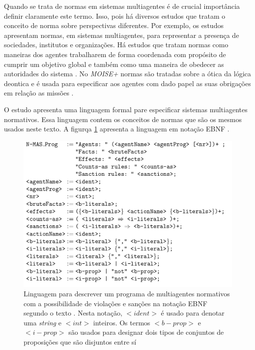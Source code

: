 Quando se trata de normas em sistemas multiagentes é de crucial importância definir claramente este termo. Isso, pois há diversos estudos que tratam o conceito de norma sobre perspectivas
diferentes. Por exemplo, os estudos \cite{formalizeagent} \cite{formalizeagent2} apresentam normas, em sistemas multiagentes, para representar a presença de sociedades, institutos e organizações.
Há estudos que tratam normas como maneiras dos agentes trabalharem de forma coordenada com propósito de cumprir um objetivo global e também como uma maneira de obedecer as autoridades do 
sistema \cite{modelingnormsforautnomousagent} \cite{amodelmultiagentsystemdynamicrelationship}. No \textit{MOISE+} normas são tratadas sobre a ótica da lógica deontica e é usada
para especificar aos agentes com dado papel as suas obrigações em relação as missões \cite{moiseframework} \cite{moiseframeworktwo}.

O estudo \cite{dastaniframework} apresenta uma linguagem formal pare especificar sistemas multiagentes normativos. Essa linguagem contem os conceitos de normas que são os mesmos usados 
neste texto. A figurqa \ref{descreveprograma} apresenta a linguagem em notação EBNF \cite{dastaniframework}.

\begin{figure}[H]
  \centering
  \includegraphics[width=0.8\linewidth]{figure/masprogram.png} 
  \caption{Linguagem para descrever um programa de multiagentes normativos com a possibilidade de violações e sanções na notação EBNF segundo o texto \cite{dastaniframework}. Nesta notação, $<ident>$ é usado para denotar uma \textit{string} e $<int>$ inteiros. Os termos $<b-prop>$ e $<i-prop>$ são usados para designar dois tipos de conjuntos de proposições que são disjuntos entre sí}
  \label{descreveprograma}
\end{figure}

